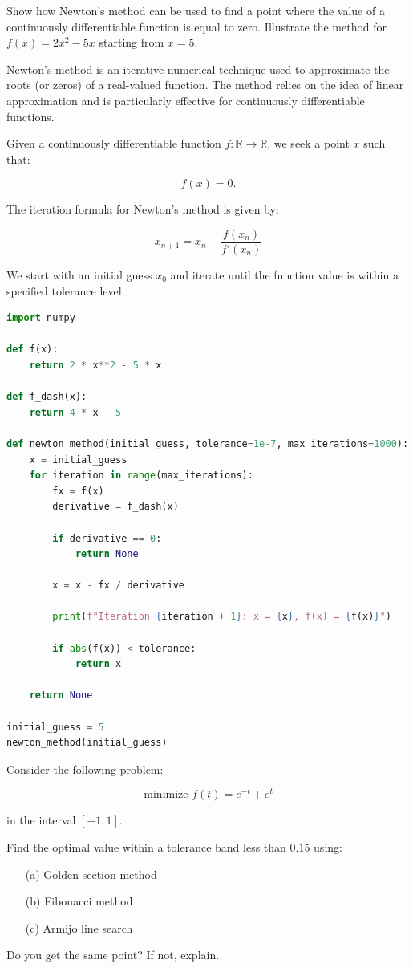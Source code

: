\documentclass{article}
\begin{document}
\begin{question*}[5]
Show how Newton's method can be used to find a point where the value of a continuously differentiable function is equal to zero. Illustrate the method for \( f(x) = 2x^2 - 5x \) starting from \( x = 5 \).
\end{question*}

Newton's method is an iterative numerical technique used to approximate the roots (or zeros) of a real-valued function. The method relies on the idea of linear approximation and is particularly effective for continuously differentiable functions.

Given a continuously differentiable function \( f: \mathbb{R} \to \mathbb{R} \), we seek a point \( x \) such that:

\[
    f(x) = 0.
\]

The iteration formula for Newton's method is given by:

\[
    x_{n+1} = x_n - \dfrac{f(x_n)}{f'(x_n)}
\]

We start with an initial guess \( x_0 \) and iterate until the function value is within a specified tolerance level.


\begin{lstlisting}[language=Python]
import numpy

def f(x):
    return 2 * x**2 - 5 * x

def f_dash(x):
    return 4 * x - 5

def newton_method(initial_guess, tolerance=1e-7, max_iterations=1000):
    x = initial_guess
    for iteration in range(max_iterations):
        fx = f(x)
        derivative = f_dash(x)
        
        if derivative == 0:
            return None
        
        x = x - fx / derivative
        
        print(f"Iteration {iteration + 1}: x = {x}, f(x) = {f(x)}")
        
        if abs(f(x)) < tolerance:
            return x
    
    return None

initial_guess = 5
newton_method(initial_guess)

\end{lstlisting}

\clearpage

\begin{question*}[6]
Consider the following problem:

\[
    \text{minimize } f(t) = e^{-t} + e^t
\]

in the interval \([-1, 1]\).

Find the optimal value within a tolerance band less than \(0.15\) using:

\begin{itemize}
    \item[(a)] Golden section method
    \item[(b)] Fibonacci method
    \item[(c)] Armijo line search
\end{itemize}

Do you get the same point? If not, explain.
\end{question*}
\end{document}

